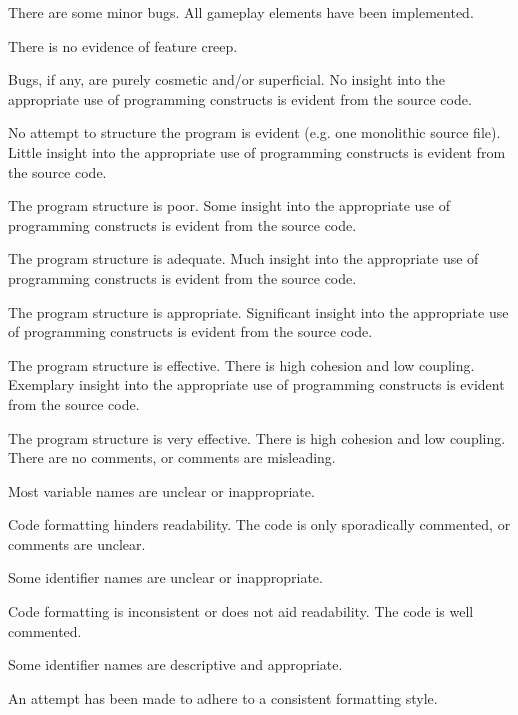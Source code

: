 \documentclass{../fal_assignment}
\begin{document}
\begin{markingrubric}
            \par There are some minor bugs.
        \grade All gameplay elements have been implemented.
            \par There is no evidence of feature creep.
            \par Bugs, if any, are purely cosmetic and/or superficial.
%
        \grade\fail No insight into the appropriate use of programming constructs is evident from the source code.
            \par No attempt to structure the program is evident (e.g. one monolithic source file).
        \grade Little insight into the appropriate use of programming constructs is evident from the source code.
            \par The program structure is poor.
        \grade Some insight into the appropriate use of programming constructs is evident from the source code.
            \par The program structure is adequate.
        \grade Much insight into the appropriate use of programming constructs is evident from the source code.
            \par The program structure is appropriate.
        \grade Significant insight into the appropriate use of programming constructs is evident from the source code.
            \par The program structure is effective. There is high cohesion and low coupling.
        \grade Exemplary insight into the appropriate use of programming constructs is evident from the source code.
            \par The program structure is very effective. There is high cohesion and low coupling.
%
        \grade\fail There are no comments, or comments are misleading.
            \par Most variable names are unclear or inappropriate.
            \par Code formatting hinders readability.
        \grade The code is only sporadically commented, or comments are unclear.
            \par Some identifier names are unclear or inappropriate.
            \par Code formatting is inconsistent or does not aid readability.
        \grade The code is well commented.
            \par Some identifier names are descriptive and appropriate.
            \par An attempt has been made to adhere to a consistent formatting style.

\end{markingrubric}
\end{document}
